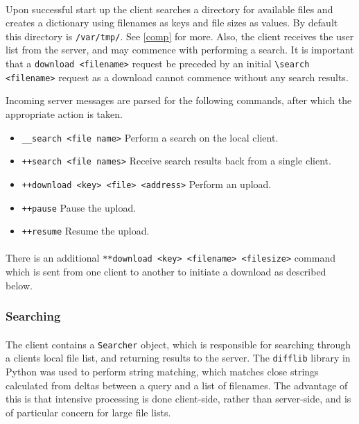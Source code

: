 \documentclass[10pt,a4paper]{article}
\begin{document}
\paragraph{} 
Upon successful start up the client searches a directory for available files and creates a dictionary using filenames as keys and file sizes as values.
By default this directory is \verb|/var/tmp/|. See \ref{comp} for more.
Also, the client receives the user list from the server, and may commence with performing a search. It is important that
a \verb|download <filename>| request be preceded by an initial \verb|\search <filename>| request as a download cannot commence without any search results.

Incoming server messages are parsed for the following commands, after which the appropriate action is taken.
\begin{itemize}
	\item \verb|__search <file name>| Perform a search on the local client.
	\item \verb|++search <file names>| Receive search results back from a single client.
	\item \verb|++download <key> <file> <address>| Perform an upload.
	\item \verb|++pause| Pause the upload.
	\item \verb|++resume| Resume the upload.
\end{itemize}
\paragraph{} 
There is an additional \verb|**download <key> <filename> <filesize>| command which is sent from one client to another to initiate a download as described below.

\subsubsection{Searching}
\paragraph{} 
The client contains a \verb|Searcher| object, which is responsible for searching through a clients local file list, and returning results to the server. The \verb|difflib| library in Python was used to perform string matching, which matches close strings calculated from deltas between a query and a list of filenames. The advantage of this is that intensive processing is done client-side, rather than server-side, and is of particular concern for large file lists.
\end{document}
